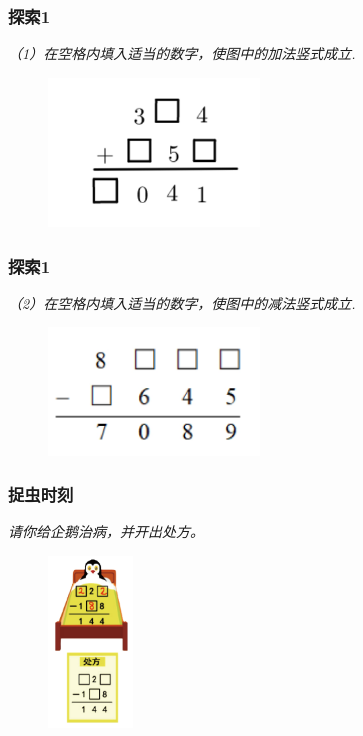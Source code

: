 \begin{frame}
    \frametitle{探索1}
    \textit{（1）在空格内填入适当的数字，使图中的加法竖式成立.}
    \begin{figure}[H] 
        \centering
        \includegraphics[width=0.5\textwidth]{./pics/Chapter_3/tansuo1_1.png}
    \end{figure}
\end{frame}

\begin{frame}
    \frametitle{探索1}
    \textit{（2）在空格内填入适当的数字，使图中的减法竖式成立.}
    \begin{figure}[H] 
        \centering
        \includegraphics[width=0.5\textwidth]{./pics/Chapter_3/tansuo1_2.png}
    \end{figure}
\end{frame}

\begin{frame}
    \frametitle{捉虫时刻}
    \textit{请你给企鹅治病，并开出处方。}
    \begin{figure}[H] 
        \centering
        \includegraphics[width=0.2\textwidth]{./pics/Chapter_3/zhuochong.png}
    \end{figure}
\end{frame}

